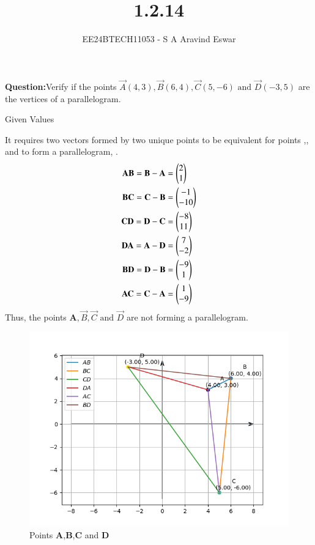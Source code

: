 \documentclass[journal]{IEEEtran}
\begin{document}

\vspace{3cm}

\title{1.2.14}
\author{EE24BTECH11053 - S A Aravind Eswar
}
{\let\newpage\relax\maketitle}

\renewcommand{\thefigure}{\theenumi}
\renewcommand{\thetable}{\theenumi}
\setlength{\intextsep}{10pt} %


\renewcommand{\thetable}{\theenumi}

\textbf{Question:}Verify if the points $\vec{A}(4, 3), \vec{B}(6, 4), \vec{C}(5, -6)\text{ and }\vec{D}(-3, 5)$ are the vertices of a
parallelogram.\\
\solution 
\begin{table}[h]
	\centering
	
	\caption{Given Values}
	\label{tab:1}
\end{table}

It requires two vectors formed by two unique points to be equivalent for points ,, and  to form a parallelogram, .
\begin{align}\textbf{AB} = \mathbf{B}-\mathbf{A} &= \begin{pmatrix}2\\1\end{pmatrix}\\\textbf{BC} = \mathbf{C}-\mathbf{B} &= \begin{pmatrix}-1\\-10\end{pmatrix}\\\textbf{CD} =\mathbf{D}-\mathbf{C} &=\begin{pmatrix}-8\\11\end{pmatrix}\\\textbf{DA} = \mathbf{A}-\mathbf{D} &= \begin{pmatrix}7\\-2\end{pmatrix}\\\textbf{BD} = \mathbf{D}-\mathbf{B} &= \begin{pmatrix}-9\\1\end{pmatrix}\\\textbf{AC} = \mathbf{C}-\mathbf{A} &= \begin{pmatrix}1\\-9\end{pmatrix}\end{align}
Thus, the points $\textbf{A},\vec{B},\vec{C} \text{ and }\vec{D}$ are not forming a parallelogram.


\begin{figure}[h]
    \centering
    \includegraphics[width=\columnwidth]{figs/fig1.png}
    \caption{Points \textbf{A},\textbf{B},\textbf{C} and \textbf{D}}
 \end{figure}
\end{document}

